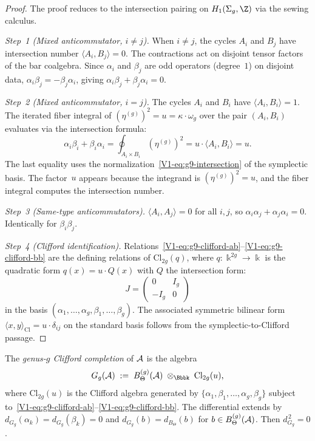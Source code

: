 \begin{proof}
The proof reduces to the intersection pairing on $H_1(\Sigma_g, \Z)$
via the sewing calculus.

\emph{Step~1 (Mixed anticommutator, $i \neq j$).}\;
When $i \neq j$, the cycles $A_i$ and $B_j$ have intersection
number $\langle A_i, B_j \rangle = 0$. The contractions act on
disjoint tensor factors of the bar coalgebra. Since $\alpha_i$ and
$\beta_j$ are odd operators (degree~$1$) on disjoint data,
$\alpha_i \beta_j = -\beta_j \alpha_i$, giving
$\alpha_i\beta_j + \beta_j\alpha_i = 0$.

\emph{Step~2 (Mixed anticommutator, $i = j$).}\;
The cycles $A_i$ and $B_i$ have $\langle A_i, B_i \rangle = 1$.
The iterated fiber integral of $(\eta^{(g)})^2 = u =
\kappa \cdot \omega_g$ over the pair $(A_i, B_i)$ evaluates via
the intersection formula:
\begin{equation}%
\alpha_i \beta_i + \beta_i \alpha_i
= \oint_{A_i \times B_i}
 (\eta^{(g)})^2
= u \cdot \langle A_i, B_i \rangle
= u.
\end{equation}
The last equality uses the normalization~\eqref{V1-eq:g9-intersection}
of the symplectic basis. The factor~$u$ appears because the
integrand is $(\eta^{(g)})^2 = u$, and the fiber integral computes
the intersection number.

\emph{Step~3 (Same-type anticommutators).}\;
$\langle A_i, A_j \rangle = 0$ for all $i, j$, so
$\alpha_i \alpha_j + \alpha_j \alpha_i = 0$. Identically for
$\beta_i \beta_j$.

\emph{Step~4 (Clifford identification).}\;
Relations~\eqref{V1-eq:g9-clifford-ab}--\eqref{V1-eq:g9-clifford-bb}
are the defining relations of $\mathrm{Cl}_{2g}(q)$, where
$q\colon \Bbbk^{2g} \to \Bbbk$ is the quadratic form
$q(x) = u \cdot Q(x)$ with $Q$ the intersection form:
\[
J = \begin{pmatrix}
0 & I_g \\ -I_g & 0
\end{pmatrix}
\]
in the basis $(\alpha_1, \ldots, \alpha_g, \beta_1, \ldots, \beta_g)$.
The associated symmetric bilinear form
$\langle x, y \rangle_{\mathrm{Cl}} = u \cdot \delta_{ij}$ on the
standard basis follows from the symplectic-to-Clifford passage.
\end{proof}

\begin{definition}
The \emph{genus-$g$ Clifford completion} of $\mathcal{A}$ is the algebra
\begin{equation}%
G_g(\cA)
\;:=\;
B_\Theta^{(g)}(\cA)
\;\otimes_{\Bbbk}\;
\mathrm{Cl}_{2g}(u),
\end{equation}
where $\mathrm{Cl}_{2g}(u)$ is the Clifford algebra generated by
$\{\alpha_1, \beta_1, \ldots, \alpha_g, \beta_g\}$ subject
to~\eqref{V1-eq:g9-clifford-ab}--\eqref{V1-eq:g9-clifford-bb}.
The differential extends by
$d_{G_g}(\alpha_k) = d_{G_g}(\beta_k) = 0$ and
$d_{G_g}(b) = d_{B_\Theta}(b)$ for $b \in B_\Theta^{(g)}(\mathcal{A})$.
Then $d_{G_g}^{\,2} = 0$.
\end{definition}


